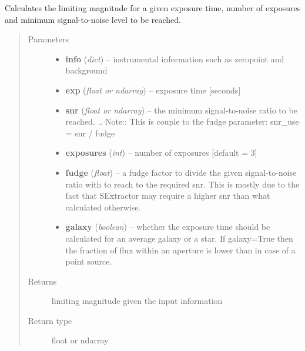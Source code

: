 \documentclass[a4paper,12pt,english]{sphinxmanual}
\begin{document}
\begin{fulllineitems}
\label{analysis:analysis.ETC.limitingMagnitude}
Calculates the limiting magnitude for a given exposure time, number of exposures and minimum signal-to-noise
level to be reached.
\begin{quote}\begin{description}
\item[{Parameters}] \leavevmode\begin{itemize}
\item {} 
\textbf{info} (\emph{dict}) -- instrumental information such as zeropoint and background

\item {} 
\textbf{exp} (\emph{float or ndarray}) -- exposure time {[}seconds{]}

\item {} 
\textbf{snr} (\emph{float or ndarray}) -- the minimum signal-to-noise ratio to be reached.
.. Note:: This is couple to the fudge parameter: snr\_use = snr / fudge

\item {} 
\textbf{exposures} (\emph{int}) -- number of exposures {[}default = 3{]}

\item {} 
\textbf{fudge} (\emph{float}) -- a fudge factor to divide the given signal-to-noise ratio with to reach to the required snr.
This is mostly due to the fact that SExtractor may require a higher snr than what calculated
otherwise.

\item {} 
\textbf{galaxy} (\emph{boolean}) -- whether the exposure time should be calculated for an average galaxy or a star.
If galaxy=True then the fraction of flux within an aperture is lower than in case of a point source.

\end{itemize}

\item[{Returns}] \leavevmode
limiting magnitude given the input information

\item[{Return type}] \leavevmode
float or ndarray

\end{description}\end{quote}

\end{fulllineitems}
\end{document}
